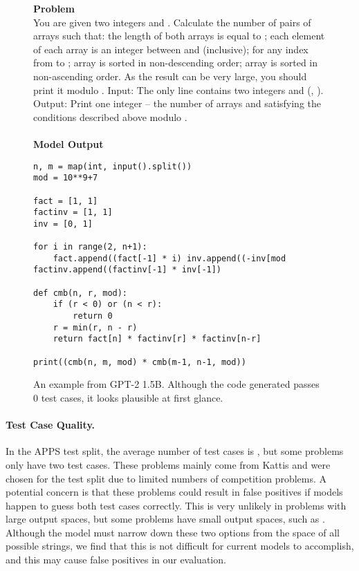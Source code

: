 \documentclass{article}
\begin{document}
\begin{figure*}
    \textbf{Problem} \\
     You are given two integers  and . Calculate the number of pairs of arrays  such that:  the length of both arrays is equal to ;  each element of each array is an integer between  and  (inclusive);   for any index  from  to ;  array  is sorted in non-descending order;  array  is sorted in non-ascending order. As the result can be very large, you should print it modulo . Input: The only line contains two integers  and  (, ). Output: Print one integer – the number of arrays  and  satisfying the conditions described above modulo .
 \\
 \\
 \textbf{Model Output}
 \begin{small}
 \begin{verbatim}
n, m = map(int, input().split())
mod = 10**9+7

fact = [1, 1]
factinv = [1, 1]
inv = [0, 1]

for i in range(2, n+1):
    fact.append((fact[-1] * i) inv.append((-inv[mod factinv.append((factinv[-1] * inv[-1]) 

def cmb(n, r, mod):
    if (r < 0) or (n < r):
        return 0
    r = min(r, n - r)
    return fact[n] * factinv[r] * factinv[n-r] 

print((cmb(n, m, mod) * cmb(m-1, n-1, mod)) \end{verbatim}
 \end{small}
    \caption{An example from GPT-2 1.5B. Although the code generated passes 0 test cases, it looks plausible at first glance.}
    \label{fig:interesting_sample_from_1500}
\end{figure*}








\paragraph{Test Case Quality.}
In the APPS test split, the average number of test cases is , but some problems only have two test cases. These problems mainly come from Kattis and were chosen for the test split due to limited numbers of competition problems. A potential concern is that these problems could result in false positives if models happen to guess both test cases correctly. This is very unlikely in problems with large output spaces, but some problems have small output spaces, such as . Although the model must narrow down these two options from the space of all possible strings, we find that this is not difficult for current models to accomplish, and this may cause false positives in our evaluation.
\end{document}
